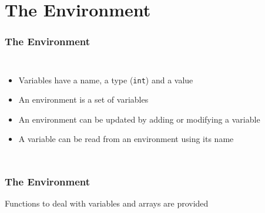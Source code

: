\documentclass{beamer}
\begin{document}
\section{The Environment}
\begin{frame}
	\frametitle{The Environment}
	\begin{columns}
		\small
		\begin{itemize}
			\item Variables have a name, a type (\texttt{int}) and a value
			\item An environment is a set of variables
			\item An environment can be updated by adding or modifying a
				variable
			\item A variable can be read from an environment using its name
		\end{itemize}
		
		
	\end{columns}
\end{frame}

\begin{frame}
	\frametitle{The Environment}
	\small
	\centerline{Functions to deal with variables and arrays are provided}
	\begin{columns}
		\column{0.4\textwidth}
		
		
		\column{0.6\textwidth}
		
		
	\end{columns}
\end{frame}
\end{document}
